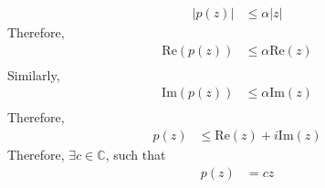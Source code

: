 \documentclass[fleqn, a4paper, 11pt, oneside]{amsart}
\theoremstyle{definition}
\theoremstyle{theorem}
\renewcommand{\Re}{\mathrm{Re}}
\renewcommand{\Im}{\mathrm{Im}}
\begin{document}
\begin{solution}
	\begin{align*}
		\left| p(z) \right| &\le \alpha |z|
	\end{align*}
	Therefore,
	\begin{align*}
		\Re\left( p(z) \right) &\le \alpha \Re(z)\\
	\end{align*}
	Similarly,
	\begin{align*}
		\Im\left( p(z) \right) &\le \alpha \Im(z)\\
	\end{align*}
	Therefore,
	\begin{align*}
		p(z) &\le \Re(z) + i \Im(z)
	\end{align*}
	Therefore, $\exists c \in \mathbb{C}$, such that
	\begin{align*}
		p(z) &= c z
	\end{align*}
\end{solution}
\end{document}
